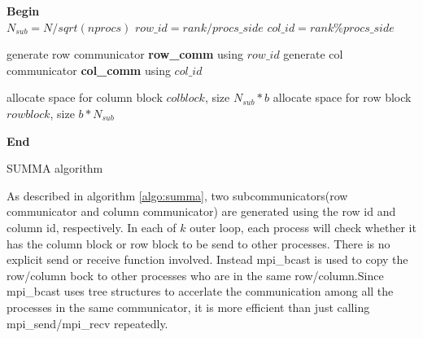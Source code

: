 \documentclass{ics-paper}
\begin{document}
\begin{algorithm}
	\SetAlgoLined


	\textbf{Begin} \\
	$N_{sub}=N/sqrt(nprocs)$ \;
	$row\_id = rank/procs\_side$\;
	$col\_id = rank\%procs\_side$ \;
	
	generate row communicator \textbf{row\_comm} using $row\_id$ \;
	generate col communicator \textbf{col\_comm} using $col\_id$ \;

	allocate space for column block $colblock$, size $N_{sub}*b$ \;
	allocate space for row block $rowblock$, size $b*N_{sub}$ \;

	
	
	\textbf{End} 
	\caption{SUMMA algorithm}
	\label{algo:summa}
\end{algorithm}

As described in algorithm \ref{algo:summa}, two subcommunicators(row communicator and column communicator) are generated using the row id and column id, respectively. In each of $k$ outer loop, each process will check whether it has the column block or row block to be send to other processes. There is no explicit send or receive function involved. Instead mpi\_bcast is used to copy the row/column bock to other processes who are in the same row/column.Since mpi\_bcast uses tree structures to accerlate the communication among all the processes in the same communicator, it is more efficient than just calling mpi\_send/mpi\_recv repeatedly.
\label{sec:algo}
\end{document}
